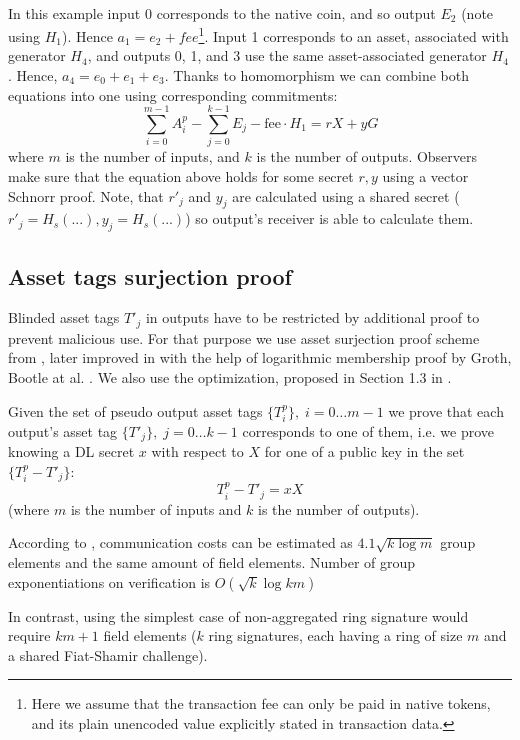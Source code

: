 \documentclass{article}
\begin{document}
\\
In this example input 0 corresponds to the native coin, and so output $E_2$ (note using $H_1$). Hence $a_1 = e_2 + \textit{fee}$\footnote{Here we assume that the transaction fee can only be paid in native tokens, and its plain unencoded value explicitly stated in transaction data.}. Input 1 corresponds to an asset, associated with generator $H_4$, and outputs 0, 1, and 3 use the same asset-associated generator $H_4$. Hence, $a_4 = e_0 + e_1 + e_3$. Thanks to homomorphism we can combine both equations into one using corresponding commitments:
\begin{equation}\label{eq_A_main_sum}
    \sum_{i=0}^{m-1}{A^p_i} - \sum_{j=0}^{k-1}{E_j} - \text{fee}\cdot H_1 = rX + yG
\end{equation}
where $m$ is the number of inputs, and $k$ is the number of outputs. Observers make sure that the equation above holds for some secret $r, y$ using a vector Schnorr proof.
Note, that $r'_j$ and $y_j$ are calculated using a shared secret ($r'_j = H_s(...), y_j = H_s(...)$) so output's receiver is able to calculate them.


\subsection{Asset tags surjection proof}
Blinded asset tags $T'_j$ in outputs have to be restricted by additional proof to prevent malicious use. For that purpose we use asset surjection proof scheme from \cite{conf_assets}, later improved in \cite{lelantus_cla} with the help of logarithmic membership proof by Groth, Bootle at al. \cite{groth_how_to_leak_a_secret}\cite{bootle_short_ring_sig}\cite{bootle_groth_low_degree}. We also use the optimization, proposed in Section 1.3 in \cite{matrict}.

Given the set of pseudo output asset tags $\{T^p_i\}, \; i = 0 \dots m-1$ we prove that each output's asset tag $\{T'_j\}, \; j = 0\dots k-1$ corresponds to one of them, i.e. we prove knowing a DL secret $x$ with respect to $X$ for one of a public key in the set $\{T^p_i - T'_j\}$:
\[ T^p_i - T'_j = xX \] (where $m$ is the number of inputs and $k$ is the number of outputs).

According to \cite{bootle_groth_low_degree}, communication costs can be estimated as $4.1 \sqrt{k \log m}$ group elements and the same amount of field elements. Number of group exponentiations on verification is $O(\sqrt{k} \log{km})$ 

In contrast, using the simplest case of non-aggregated ring signature would require $km + 1$ field elements ($k$ ring signatures, each having a ring of size $m$ and a shared Fiat-Shamir challenge).
\end{document}
